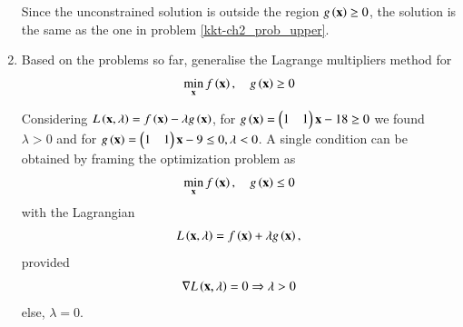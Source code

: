 \begin{enumerate}[label=\thesubsection.\arabic*,ref=\thesubsection.\theenumi]
%
\solution Since the unconstrained solution is outside the region $g\left(\mathbf{x}\right) \geq 0$, the solution is the same as the one in problem \ref{kkt-ch2_prob_upper}.
%
\item
Based on the problems so far, generalise the Lagrange multipliers method for 
%
	 \begin{align}
	 \label{kkt-ch2_lagrange_ineq}
	\min_{\mathbf{x}} f\left(\mathbf{x}\right) , \quad 
	 g\left(\mathbf{x}\right)  \geq 0 
	 \end{align}
%

%
\solution
Considering $L\left(\mathbf{x},\lambda\right) = f\left(\mathbf{x}\right) - \lambda g\left(\mathbf{x}\right)$, for $g\left(\mathbf{x}\right) = \begin{pmatrix}1 & 1\end{pmatrix}\mathbf{x} - 18 \geq 0$ we found $\lambda > 0 $ and for $g\left(\mathbf{x}\right) = \begin{pmatrix}1 & 1\end{pmatrix}\mathbf{x} - 9 \leq 0, \lambda < 0$. A single condition can be obtained by framing the optimization problem as
%
	 \begin{align}
	 \label{kkt-ch2_lagrange_ineq_summary}
	\min_{\mathbf{x}} f\left(\mathbf{x}\right) , \quad 
	 g\left(\mathbf{x}\right)  \leq 0 
	 \end{align}
%
with the Lagrangian
%
\begin{equation}
L\brak{\mbf{x},\lambda} = f\brak{\mbf{x}} + \lambda g\brak{\mbf{x}}, %
\end{equation}
%
provided
%
\begin{equation}
\label{kkt-ch2_kkt_necessary}
\nabla L\left(\mathbf{x},\lambda\right) = 0 \Rightarrow \lambda > 0
\end{equation}
else, $\lambda = 0$.
\end{enumerate}
